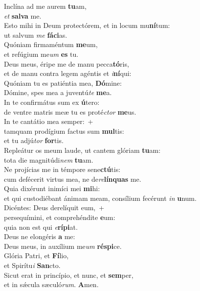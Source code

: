 \evenverse Inclína ad me aurem \textbf{tu}am,~\*\\
\evenverse \textit{et} \textbf{sal}\textbf{va} me.\\
\oddverse Esto mihi in Deum protectórem, et in locum mu\textbf{ní}tum:~\*\\
\oddverse ut salvum \textit{me} \textbf{fá}\textbf{ci}as.\\
\evenverse Quóniam firmaméntum \textbf{me}um,~\*\\
\evenverse et refúgium me\textit{um} \textbf{es} tu.\\
\oddverse Deus meus, éripe me de manu pecca\textbf{tó}ris,~\*\\
\oddverse et de manu contra legem agéntis et \textit{i}\textbf{ní}qui:\\
\evenverse Quóniam tu es patiéntia mea, \textbf{Dó}mine:~\*\\
\evenverse Dómine, spes mea a juventú\textit{te} \textbf{me}a.\\
\oddverse In te confirmátus sum ex \textbf{ú}tero:~\*\\
\oddverse de ventre matris meæ tu es proté\textit{ctor} \textbf{me}us.\\
\evenverse In te cantátio mea semper:~+\\
\evenverse  tamquam prodígium factus sum \textbf{mul}tis:~\*\\
\evenverse et tu adjú\textit{tor} \textbf{for}tis.\\
\oddverse Repleátur os meum laude, ut cantem glóriam \textbf{tu}am:~\*\\
\oddverse tota die magnitúdi\textit{nem} \textbf{tu}am.\\
\evenverse Ne projícias me in témpore sene\textbf{ctú}tis:~\*\\
\evenverse cum defécerit virtus mea, ne de\textit{re}\textbf{lín}\textbf{quas} me.\\
\oddverse Quia dixérunt inimíci mei \textbf{mi}hi:~\*\\
\oddverse et qui custodiébant ánimam meam, consílium fecérunt \textit{in} \textbf{u}num.\\
\evenverse Dicéntes: Deus derelíquit eum,~+\\
\evenverse  persequímini, et comprehéndite \textbf{e}um:~\*\\
\evenverse quia non est qui \textit{e}\textbf{rí}\textbf{pi}at.\\
\oddverse Deus ne elongéris \textbf{a} me:~\*\\
\oddverse Deus meus, in auxílium me\textit{um} \textbf{ré}\textbf{spi}ce.\\
\evenverse Glória Patri, et \textbf{Fí}lio,~\*\\
\evenverse et Spirítu\textit{i} \textbf{San}cto.\\
\oddverse Sicut erat in princípio, et nunc, et \textbf{sem}per,~\*\\
\oddverse et in sǽcula sæculó\textit{rum}. \textbf{A}men.\\
